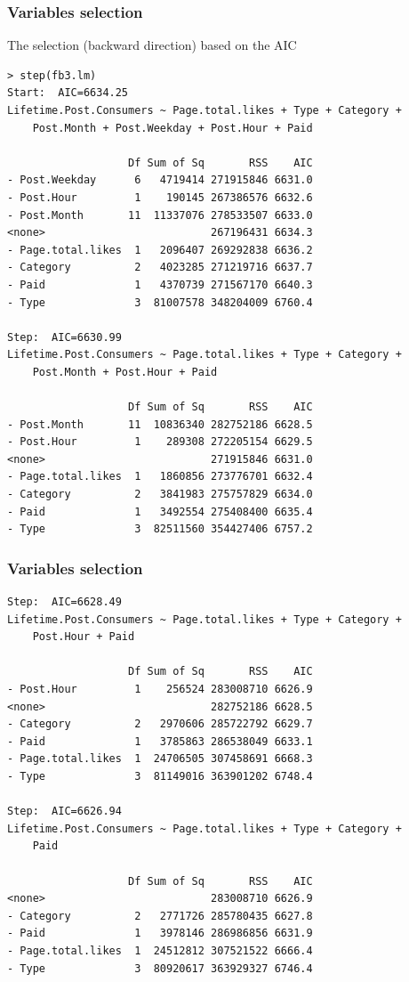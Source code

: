 \begin{frame}[fragile]
\frametitle{Variables selection}
The selection (backward direction) based on the AIC
\tiny
\begin{verbatim}
> step(fb3.lm)
Start:  AIC=6634.25
Lifetime.Post.Consumers ~ Page.total.likes + Type + Category + 
    Post.Month + Post.Weekday + Post.Hour + Paid

                   Df Sum of Sq       RSS    AIC
- Post.Weekday      6   4719414 271915846 6631.0
- Post.Hour         1    190145 267386576 6632.6
- Post.Month       11  11337076 278533507 6633.0
<none>                          267196431 6634.3
- Page.total.likes  1   2096407 269292838 6636.2
- Category          2   4023285 271219716 6637.7
- Paid              1   4370739 271567170 6640.3
- Type              3  81007578 348204009 6760.4

Step:  AIC=6630.99
Lifetime.Post.Consumers ~ Page.total.likes + Type + Category + 
    Post.Month + Post.Hour + Paid

                   Df Sum of Sq       RSS    AIC
- Post.Month       11  10836340 282752186 6628.5
- Post.Hour         1    289308 272205154 6629.5
<none>                          271915846 6631.0
- Page.total.likes  1   1860856 273776701 6632.4
- Category          2   3841983 275757829 6634.0
- Paid              1   3492554 275408400 6635.4
- Type              3  82511560 354427406 6757.2
\end{verbatim}
\end{frame}
\begin{frame}[fragile]
\frametitle{Variables selection}
\tiny
\begin{verbatim}
Step:  AIC=6628.49
Lifetime.Post.Consumers ~ Page.total.likes + Type + Category + 
    Post.Hour + Paid

                   Df Sum of Sq       RSS    AIC
- Post.Hour         1    256524 283008710 6626.9
<none>                          282752186 6628.5
- Category          2   2970606 285722792 6629.7
- Paid              1   3785863 286538049 6633.1
- Page.total.likes  1  24706505 307458691 6668.3
- Type              3  81149016 363901202 6748.4

Step:  AIC=6626.94
Lifetime.Post.Consumers ~ Page.total.likes + Type + Category + 
    Paid

                   Df Sum of Sq       RSS    AIC
<none>                          283008710 6626.9
- Category          2   2771726 285780435 6627.8
- Paid              1   3978146 286986856 6631.9
- Page.total.likes  1  24512812 307521522 6666.4
- Type              3  80920617 363929327 6746.4

\end{verbatim}
\end{frame}
